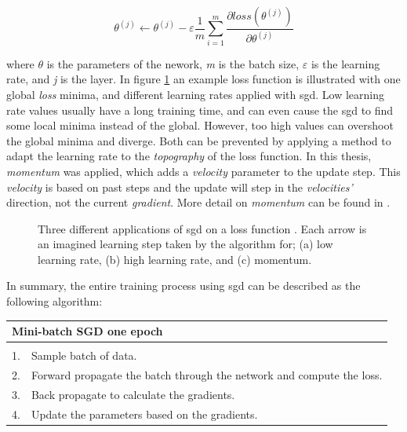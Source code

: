     \begin{equation}
    \theta^{(j)} \leftarrow \theta^{(j)} - \varepsilon \dfrac{1}{m}\sum_{i=1}^{m} \dfrac{\partial loss (\theta^{(j)})}{\partial \theta^{(j)}}
    \end{equation}
    
    where $\theta$ is the parameters of the nework, \textit{m} is the batch size, $\varepsilon$ is the learning rate, and \textit{j} is the layer. In figure \ref{learning_rates} an example loss function is illustrated with one global \textit{loss} minima, and different learning rates applied with \gls{sgd}. Low learning rate values usually have a long training time, and can even cause the \gls{sgd} to find some local minima instead of the global\cite{farsal2018deep}. However, too high values can overshoot the global minima and diverge. Both can be prevented by applying a method to adapt the learning rate to the \textit{topography} of the loss function. In this thesis, \textit{momentum} was applied, which adds a \textit{velocity} parameter to the update step. This \textit{velocity} is based on past steps and the update will step in the \textit{velocities'} direction, not the current \textit{gradient}. More detail on \textit{momentum} can be found in \citeauthor{pmlr-v28-sutskever13}\cite{pmlr-v28-sutskever13}.
    
    \begin{figure}[H]
        \centering

        
        \caption[Learning rates]{Three different applications of \gls{sgd} on a loss function . Each arrow is an imagined learning step taken by the algorithm for; (a) low learning rate, (b) high learning rate, and (c) momentum.}
      	\medskip 
        \label{learning_rates}
    \end{figure}

    In summary, the entire training process using \gls{sgd} can be described as the following algorithm\cite{farsal2018deep}:
    
    \begin{longtable}{lllllll} \label{sgd algorithm}\\
    \hline
    \multicolumn{7}{l}{Mini-batch SGD one epoch}                                                              \\ \hline
    \endfirsthead
    \endhead
    \hline
    \endfoot
    \endlastfoot
    \multicolumn{7}{l}{Loop:}                                                                       \\
    1.   & \multicolumn{6}{l}{Sample batch of data.}                                                \\
    2.   & \multicolumn{6}{l}{Forward propagate the batch through the network and compute the loss.} \\
    3.   & \multicolumn{6}{l}{Back propagate to calculate the gradients.}                            \\
    4.   & \multicolumn{6}{l}{Update the parameters based on the gradients.}                         \\ \hline
    \end{longtable}
    
